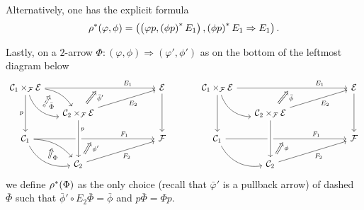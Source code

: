 \documentclass[a4paper,10pt
]{article}%
\numberwithin{equation}{section}
\numberwithin{figure}{section}
\theoremstyle{definition} %
\newcommand{\1}{\ensuremath{\mathbbm 1}}%
\begin{document}
Alternatively, one has the explicit formula
\[
\rho^{\**} (\varphi,\phi)=
\left(
\left( \varphi p,
\left( \phi p \right)^{\**} E_1 \right),
\left( \phi p \right)^{\**} E_1 \Rightarrow E_1
\right).
\]



Lastly, on a $2$-arrow $\Phi \colon (\varphi,\phi) \Rightarrow (\varphi',\phi')$
as on the bottom of the leftmost diagram below
\begin{equation}\label{PULL2ARR EQ}
\begin{tikzcd}[column sep = 16pt, row sep = 13pt]
\mathcal{C}_1 \times_{\mathcal{F}} \mathcal{E} 
\ar{rrrrr}[name=toE]{}[near end]{E_1} 
\ar[bend left=23]{rd}[near start, swap, name=FE]{}
\ar[bend right=35]{rd}[name=FFE]{} \ar{dd}[swap]{p}
&&&
&&
\mathcal{E}  \ar{dd}
&&
\mathcal{C}_1 \times_{\mathcal{F}} \mathcal{E} 
\ar{rrrrr}[name=toE2]{}[near end]{E_1} 
\ar[bend right=35]{rd}{} \ar{dd}
&&&
&&
\mathcal{E}  \ar{dd}
\\
&
|[alias=DBE]|
\mathcal{C}_2 \times_{\mathcal{F}} \mathcal{E} \ar{rrrru}[swap]{E_2}
\ar{dd}[near start]{p} &&&&
&&
&
|[alias=DBE2]|
\mathcal{C}_2 \times_{\mathcal{F}} \mathcal{E} \ar{rrrru}[swap]{E_2} &&&&
\\
\mathcal{C}_1 \ar{rrrrr}[name=toB]{}[near end]{F_1} 
\ar[bend left=23]{rd}[swap,name=FF]{}
\ar[bend right=35]{rd} [name=F]{}
&&&
&&
\mathcal{F} 
&&
\mathcal{C}_1 \ar{rrrrr}[name=toB2]{}[near end]{F_1} 
\ar[bend right=35]{rd}{}
&&&
&&
\mathcal{F} 
\\
&
|[alias=D]| \mathcal{C}_2 \ar{rrrru}[swap]{F_2} &&&&
&&
&
|[alias=D2]|
\mathcal{C}_2 \ar{rrrru}[swap]{F_2} &&&&
\arrow[Rightarrow, from=DBE, to=toE, shorten <=0.15cm,shorten >=0.15cm
,swap,near end,"\bar{\phi}'"
]
\arrow[Rightarrow, from=DBE2, to=toE2, shorten <=0.15cm,shorten >=0.15cm
,swap,near end,"\bar{\phi}"
]
\arrow[Rightarrow, from=D, to=toB, shorten <=0.15cm,shorten >=0.15cm,swap,near end,"\phi'"]
\arrow[Rightarrow, from=D2, to=toB2, shorten <=0.15cm,shorten >=0.15cm,swap,near end,"\phi"]
\arrow[Rightarrow, from=F, to=FF, shorten <=0cm,shorten >=0cm,swap,"\Phi"]
\arrow[Rightarrow, from=FFE, to=FE, shorten <=0cm,shorten >=0cm,swap,dashed,"\bar{\Phi}"]
\arrow[from=DBE, to=D, crossing over]
\arrow[from=DBE2, to=D2, crossing over]
\end{tikzcd}
\end{equation}
we define $\rho^{\**}(\Phi)$
as the only choice (recall that $\bar{\varphi}'$ is a pullback arrow)
of dashed $\bar{\Phi}$
such that $\bar{\phi}' \circ E_2\bar{\Phi} = \bar{\phi}$
and $p \bar{\Phi} = \Phi p$.
\end{document}
